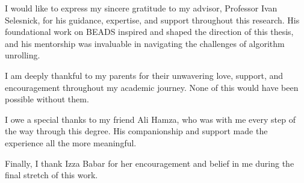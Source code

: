 
I would like to express my sincere gratitude to my advisor, Professor Ivan Selesnick, for his guidance, expertise, and support throughout this research. His foundational work on BEADS inspired and shaped the direction of this thesis, and his mentorship was invaluable in navigating the challenges of algorithm unrolling.

I am deeply thankful to my parents for their unwavering love, support, and encouragement throughout my academic journey. None of this would have been possible without them.

I owe a special thanks to my friend Ali Hamza, who was with me every step of the way through this degree. His companionship and support made the experience all the more meaningful.

Finally, I thank Izza Babar for her encouragement and belief in me during the final stretch of this work.

\noindent
{}
\makebox[\textwidth]{\hfill\makebox[3in]{\hfill\graddate\hfill}}